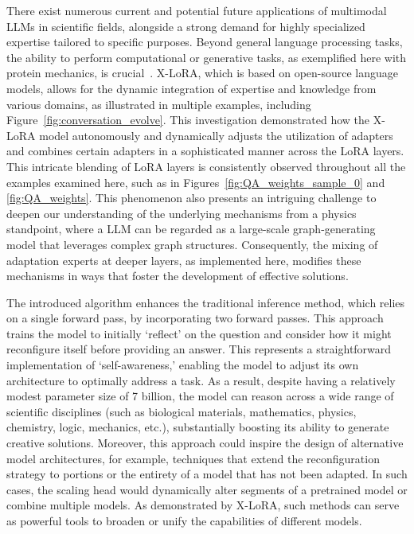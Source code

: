 There exist numerous current and potential future applications of multimodal LLMs in scientific fields, alongside a strong demand for highly specialized expertise tailored to specific purposes. Beyond general language processing tasks, the ability to perform computational or generative tasks, as exemplified here with protein mechanics, is crucial~\cite{Luu2023BioinspiredLLM:Materials,Buehler2023MechGPTModalities,Buehler2023MeLMProblemsb}. X-LoRA, which is based on open-source language models, allows for the dynamic integration of expertise and knowledge from various domains, as illustrated in multiple examples, including Figure~\ref{fig:conversation_evolve}. This investigation demonstrated how the X-LoRA model autonomously and dynamically adjusts the utilization of adapters and combines certain adapters in a sophisticated manner across the LoRA layers. This intricate blending of LoRA layers is consistently observed throughout all the examples examined here, such as in Figures~\ref{fig:QA_weights_sample_0} and \ref{fig:QA_weights}. This phenomenon also presents an intriguing challenge to deepen our understanding of the underlying mechanisms from a physics standpoint, where a LLM can be regarded as a large-scale graph-generating model that leverages complex graph structures. Consequently, the mixing of adaptation experts at deeper layers, as implemented here, modifies these mechanisms in ways that foster the development of effective solutions.

The introduced algorithm enhances the traditional inference method, which relies on a single forward pass, by incorporating two forward passes. This approach trains the model to initially ‘reflect’ on the question and consider how it might reconfigure itself before providing an answer. This represents a straightforward implementation of ‘self-awareness,’ enabling the model to adjust its own architecture to optimally address a task. As a result, despite having a relatively modest parameter size of 7 billion, the model can reason across a wide range of scientific disciplines (such as biological materials, mathematics, physics, chemistry, logic, mechanics, etc.), substantially boosting its ability to generate creative solutions. Moreover, this approach could inspire the design of alternative model architectures, for example, techniques that extend the reconfiguration strategy to portions or the entirety of a model that has not been adapted. In such cases, the scaling head would dynamically alter segments of a pretrained model or combine multiple models. As demonstrated by X-LoRA, such methods can serve as powerful tools to broaden or unify the capabilities of different models.

